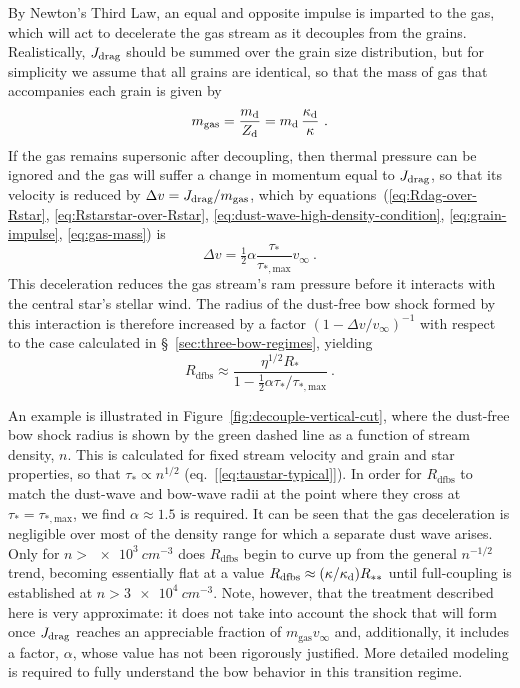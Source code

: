 By Newton's Third Law, an equal and opposite impulse is imparted to
the gas, which will act to decelerate the gas stream as it decouples
from the grains.  Realistically, \(J_{\text{drag}}\) should be summed over the
grain size distribution, but for simplicity we assume that all grains
are identical, so that the mass of gas that accompanies each grain is
given by
\begin{equation}
  \label{eq:gas-mass}
  m_{\text{gas}} = \frac{m_{\text{d}}}{Z_{\text{d}}} =  m_{\text{d}} \, \frac{\kappa_{\text{d}}}{\kappa} \ . 
\end{equation}
If the gas remains supersonic after decoupling, then thermal pressure
can be ignored and the gas will suffer a change in momentum equal to
\(J_{\text{drag}}\), so that its velocity is reduced by
\(\Delta v = J_{\text{drag}} / m_{\text{gas}}\), which by
equations~(\ref{eq:Rdag-over-Rstar}, \ref{eq:Rstarstar-over-Rstar},
\ref{eq:dust-wave-high-density-condition}, \ref{eq:grain-impulse},
\ref{eq:gas-mass}) is
\begin{equation}
  \label{eq:gas-dv}
  \Delta v = \tfrac12 \alpha \frac{\tau_*}{\tau_{*, \text{max}}} v_\infty\ .
\end{equation}
This deceleration reduces the gas stream's ram pressure before it
interacts with the central star's stellar wind.  The radius of the
dust-free bow shock formed by this interaction is therefore increased
by a factor \((1 - \Delta v / v_\infty)^{-1}\) with respect to the case
calculated in \S~\ref{sec:three-bow-regimes}, yielding
\begin{equation}
  \label{eq:gas-free-bow-shock}
  R_{\text{dfbs}} \approx \frac{\eta^{1/2} R_*}{1 - \tfrac12 \alpha \tau_* / \tau_{*, \text{max}}} \ .
\end{equation}

An example is illustrated in Figure~\ref{fig:decouple-vertical-cut},
where the dust-free bow shock radius is shown by the green dashed line
as a function of stream density, \(n\).  This is calculated for fixed
stream velocity and grain and star properties, so that
\(\tau_* \propto n^{1/2}\) (eq.~[\ref{eq:taustar-typical}]).  In order for
\(R_{\text{dfbs}}\) to match the dust-wave and bow-wave radii at the
point where they cross at \(\tau_* = \tau_{*, \text{max}}\), we find
\(\alpha \approx 1.5\) is required.  It can be seen that the gas deceleration is
negligible over most of the density range for which a separate dust
wave arises.  Only for \(n > \SI{e3}{cm^{-3}}\) does
\(R_{\text{dfbs}}\) begin to curve up from the general \(n^{-1/2}\)
trend, becoming essentially flat at a value
\(R_{\text{dfbs}} \approx (\kappa/\kappa_{\text{d}}) R_{**}\) until full-coupling is
established at \(n > \SI{3e4}{cm^{-3}}\).  Note, however, that the
treatment described here is very approximate: it does not take into
account the shock that will form once \(J_{\text{drag}}\) reaches an
appreciable fraction of \(m_{\text{gas}} v_\infty\) and, additionally, it
includes a factor, \(\alpha\), whose value has not been rigorously
justified.  More detailed modeling is required to fully understand the
bow behavior in this transition regime.



